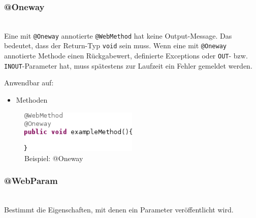 \documentclass[runningheads]{llncs}
\begin{document}
    \subsubsection{@Oneway}\ \\
      Eine mit \texttt{@Oneway} annotierte \texttt{@WebMethod} hat keine Output-Message. Das
      bedeutet, dass der Return-Typ \texttt{void} sein muss. Wenn eine mit \texttt{@Oneway}
      annotierte Methode einen Rückgabewert, definierte Exceptions oder \texttt{OUT}- bzw.
      \texttt{INOUT}-Parameter hat, muss spätestens zur Laufzeit ein Fehler gemeldet werden.

      \noindent{}Anwendbar auf:
      \begin{itemize}
       \item Methoden\vfill
      \end{itemize}\vfill
    \begin{figure}[ht!]
      \centering
      \includegraphics[width=0.5\textwidth]{../images/AtOneway.png}
      \caption{Beispiel: @Oneway}
      \label{fig:oneway}
    \end{figure}

    \subsubsection{@WebParam}\ \\
      Bestimmt die Eigenschaften, mit denen ein Parameter veröffentlicht wird.
\end{document}

